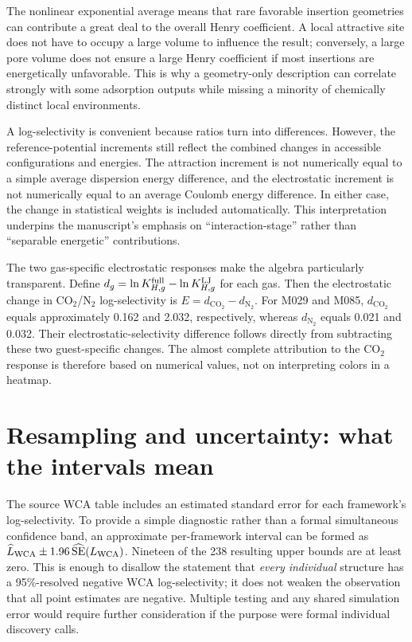 \documentclass[11pt,a4paper]{article}
\begin{document}
The nonlinear exponential average means that rare favorable insertion geometries can contribute a great deal to the overall Henry coefficient. A local attractive site does not have to occupy a large volume to influence the result; conversely, a large pore volume does not ensure a large Henry coefficient if most insertions are energetically unfavorable. This is why a geometry-only description can correlate strongly with some adsorption outputs while missing a minority of chemically distinct local environments.

A log-selectivity is convenient because ratios turn into differences. However, the reference-potential increments still reflect the combined changes in accessible configurations and energies. The attraction increment is not numerically equal to a simple average dispersion energy difference, and the electrostatic increment is not numerically equal to an average Coulomb energy difference. In either case, the change in statistical weights is included automatically. This interpretation underpins the manuscript's emphasis on ``interaction-stage'' rather than ``separable energetic'' contributions.

The two gas-specific electrostatic responses make the algebra particularly transparent. Define $d_g=\ln K_{H,g}^{\rm full}-\ln K_{H,g}^{\rm LJ}$ for each gas. Then the electrostatic change in CO$_2$/N$_2$ log-selectivity is $E=d_{\mathrm{CO_2}}-d_{\mathrm{N_2}}$. For M029 and M085, $d_{\mathrm{CO_2}}$ equals approximately 0.162 and 2.032, respectively, whereas $d_{\mathrm{N_2}}$ equals 0.021 and 0.032. Their electrostatic-selectivity difference follows directly from subtracting these two guest-specific changes. The almost complete attribution to the CO$_2$ response is therefore based on numerical values, not on interpreting colors in a heatmap.

\section{Resampling and uncertainty: what the intervals mean}

The source WCA table includes an estimated standard error for each framework's log-selectivity. To provide a simple diagnostic rather than a formal simultaneous confidence band, an approximate per-framework interval can be formed as $\widehat{L}_{\rm WCA}\pm1.96\,\widehat{\rm SE}(L_{\rm WCA})$. Nineteen of the 238 resulting upper bounds are at least zero. This is enough to disallow the statement that \emph{every individual} structure has a 95\%-resolved negative WCA log-selectivity; it does not weaken the observation that all point estimates are negative. Multiple testing and any shared simulation error would require further consideration if the purpose were formal individual discovery calls.
\end{document}
